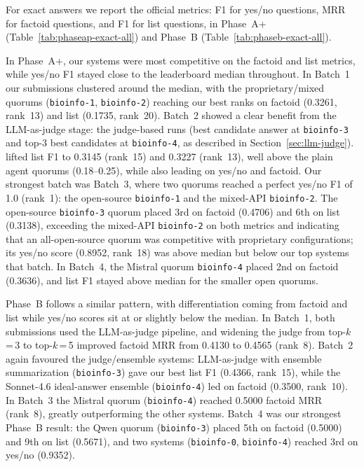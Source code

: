 For exact answers we report the official metrics: F1 for yes/no questions,
MRR for factoid questions, and F1 for list questions, in Phase~A+
(Table~\ref{tab:phaseap-exact-all}) and Phase~B (Table~\ref{tab:phaseb-exact-all}).

In Phase~A+, our systems were most competitive on the factoid and list metrics, while yes/no F1 stayed close to the leaderboard median throughout. In Batch~1 our submissions clustered around the median, with the proprietary/mixed quorums (\texttt{bioinfo-1}, \texttt{bioinfo-2}) reaching our best ranks on factoid (0.3261, rank~13) and list (0.1735, rank~20). Batch~2 showed a clear benefit from the LLM-as-judge stage: the judge-based runs (best candidate answer at \texttt{bioinfo-3} and top-3 best candidates at \texttt{bioinfo-4}, as described in Section~\ref{sec:llm-judge}). lifted list F1 to 0.3145 (rank~15) and 0.3227 (rank~13), well above the plain agent quorums (0.18--0.25), while also leading on yes/no and factoid. Our strongest batch was Batch~3, where two quorums reached a perfect yes/no F1 of 1.0 (rank~1): the open-source \texttt{bioinfo-1} and the mixed-API \texttt{bioinfo-2}. The open-source \texttt{bioinfo-3} quorum placed 3rd on factoid (0.4706) and 6th on list (0.3138), exceeding the mixed-API \texttt{bioinfo-2} on both metrics and indicating that an all-open-source quorum was competitive with proprietary configurations; its yes/no score (0.8952, rank~18) was above median but below our top systems that batch. In Batch~4, the Mistral quorum \texttt{bioinfo-4} placed 2nd on factoid (0.3636), and list F1 stayed above median for the smaller open quorums.

Phase~B follows a similar pattern, with differentiation coming from factoid and list
while yes/no scores sit at or slightly below the median. In Batch~1, both submissions
used the LLM-as-judge pipeline, and widening the judge from top-$k$\,=\,3 to
top-$k$\,=\,5 improved factoid MRR from 0.4130 to 0.4565 (rank~8). Batch~2 again
favoured the judge/ensemble systems: LLM-as-judge with ensemble summarization
(\texttt{bioinfo-3}) gave our best list F1 (0.4366, rank~15), while the Sonnet-4.6
ideal-answer ensemble (\texttt{bioinfo-4}) led on factoid (0.3500, rank~10). In
Batch~3 the Mistral quorum (\texttt{bioinfo-4}) reached 0.5000 factoid MRR (rank~8), greatly outperforming the other systems.
Batch~4 was our strongest Phase~B result: the Qwen quorum (\texttt{bioinfo-3}) placed
5th on factoid (0.5000) and 9th on list (0.5671), and two systems (\texttt{bioinfo-0},
\texttt{bioinfo-4}) reached 3rd on yes/no (0.9352).

